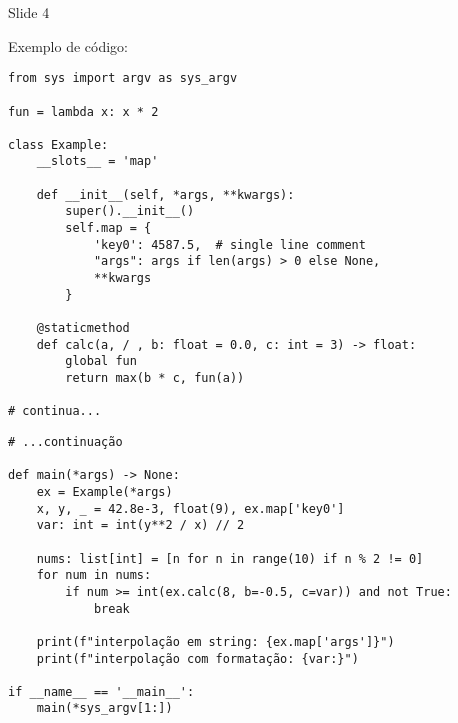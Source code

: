 \begin{frame}[fragile]{Slide 4}

Exemplo de código:

\begin{verbatim}
from sys import argv as sys_argv

fun = lambda x: x * 2

class Example:
    __slots__ = 'map'

    def __init__(self, *args, **kwargs):
        super().__init__()
        self.map = {
            'key0': 4587.5,  # single line comment
            "args": args if len(args) > 0 else None,
            **kwargs
        }

    @staticmethod
    def calc(a, / , b: float = 0.0, c: int = 3) -> float:
        global fun
        return max(b * c, fun(a))

# continua...
\end{verbatim}

\end{frame}
\begin{frame}[fragile, t]

\begin{verbatim}
# ...continuação

def main(*args) -> None:
    ex = Example(*args)
    x, y, _ = 42.8e-3, float(9), ex.map['key0']
    var: int = int(y**2 / x) // 2

    nums: list[int] = [n for n in range(10) if n % 2 != 0]
    for num in nums:
        if num >= int(ex.calc(8, b=-0.5, c=var)) and not True:
            break

    print(f"interpolação em string: {ex.map['args']}")
    print(f"interpolação com formatação: {var:}")

if __name__ == '__main__':
    main(*sys_argv[1:])

\end{verbatim}
\end{frame}
